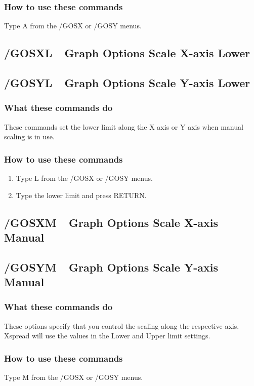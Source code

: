 \subsubsection*{How to use these commands}
Type A from the /GOSX or /GOSY menus.

\subsection*{/GOSXL\ \   Graph Options Scale X-axis Lower}
\subsection*{/GOSYL\ \   Graph Options Scale Y-axis Lower}

\subsubsection*{What these commands do}
These commands set the lower limit along the X axis or Y axis when 
manual scaling is in use.

\subsubsection*{How to use these commands}
\begin{enumerate}
\item{Type L from the /GOSX or /GOSY menus.}
\item{Type the lower limit and press RETURN.}
\end{enumerate}
 
\subsection*{/GOSXM\ \   Graph Options Scale X-axis Manual}
\subsection*{/GOSYM\ \   Graph Options Scale Y-axis Manual}

\subsubsection*{What these commands do}
These options specify that you control the scaling along the 
respective axis.  Xspread will use the values in the Lower and Upper 
limit settings.

\subsubsection*{How to use these commands}
Type M from the /GOSX or /GOSY menus.

